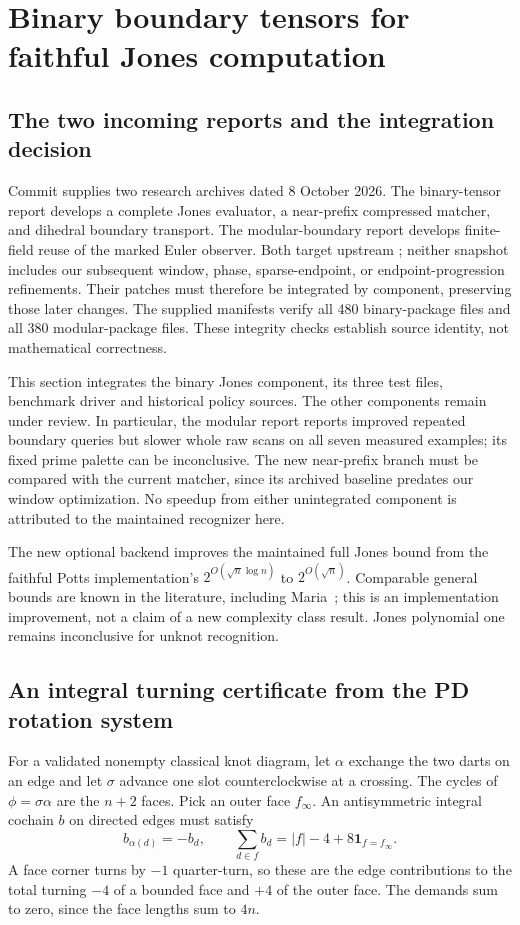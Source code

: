 \section{Binary boundary tensors for faithful Jones computation}
\label{sec:spin-jones}

\subsection{The two incoming reports and the integration decision}
Commit  supplies two research archives dated 8 October 2026.
The binary-tensor report develops a complete Jones evaluator, a near-prefix
compressed matcher, and dihedral boundary transport. The modular-boundary
report develops finite-field reuse of the marked Euler observer. Both target
upstream ; neither snapshot includes our subsequent window,
phase, sparse-endpoint, or endpoint-progression refinements. Their patches
must therefore be integrated by component, preserving those later changes.
The supplied manifests verify all 480 binary-package files and all 380
modular-package files. These integrity checks establish source identity,
not mathematical correctness.

This section integrates the binary Jones component, its three test files,
benchmark driver and historical policy sources. The other components remain
under review. In particular, the modular report reports improved repeated
boundary queries but slower whole raw scans on all seven measured examples;
its fixed prime palette can be inconclusive. The new near-prefix branch
must be compared with the current matcher, since its archived baseline
predates our window optimization. No speedup from either unintegrated
component is attributed to the maintained recognizer here.

The new optional  backend improves the maintained full
Jones bound from the faithful Potts implementation's
$2^{O(\sqrt n\log n)}$ to $2^{O(\sqrt n)}$. Comparable general bounds are known
in the literature, including Maria~\cite{quantum-width}; this is an
implementation improvement, not a claim of a new complexity class result.
Jones polynomial one remains inconclusive for unknot recognition.

\subsection{An integral turning certificate from the PD rotation system}
For a validated nonempty classical knot diagram, let $\alpha$ exchange the
two darts on an edge and let $\sigma$ advance one slot counterclockwise at
a crossing. The cycles of $\phi=\sigma\alpha$ are the $n+2$ faces. Pick an
outer face $f_\infty$. An antisymmetric integral cochain $b$ on directed edges
must satisfy
\[
 b_{\alpha(d)}=-b_d,\qquad
 \sum_{d\in f}b_d=|f|-4+8\mathbf1_{f=f_\infty}.
\]
A face corner turns by $-1$ quarter-turn, so these are the edge contributions
to the total turning $-4$ of a bounded face and $+4$ of the outer face.
The demands sum to zero, since the face lengths sum to $4n$.

